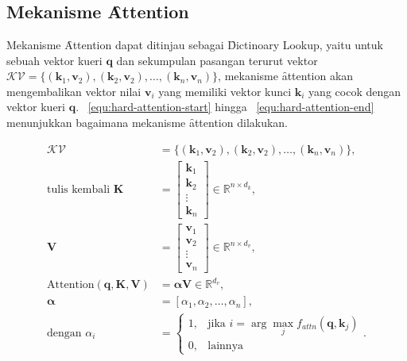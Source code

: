 \chapter{\babTiga}
\label{bab:3}


\section{Mekanisme \f{Attention}}


Mekanisme \f{Attention} dapat ditinjau sebagai \f{Dictinoary Lookup}, yaitu untuk sebuah vektor kueri $\mathbf{q}$ dan sekumpulan pasangan terurut vektor $\mathcal{KV} = \{(\mathbf{k}_1, \mathbf{v}_2), (\mathbf{k}_2, \mathbf{v}_2), \dots, (\mathbf{k}_n, \mathbf{v}_n)\}$, mekanisme \f{attention} akan mengembalikan vektor nilai $\mathbf{v}_i$ yang memiliki vektor kunci $\mathbf{k}_i$ yang cocok dengan vektor kueri $\mathbf{q}$. \equ~\ref{equ:hard-attention-start} hingga \equ~\ref{equ:hard-attention-end} menunjukkan bagaimana mekanisme \f{attention} dilakukan.

\begin{align}
	\label{equ:hard-attention-start}
	\mathcal{KV} &= \{(\mathbf{k}_1, \mathbf{v}_2), (\mathbf{k}_2, \mathbf{v}_2), \dots, (\mathbf{k}_n, \mathbf{v}_n)\}, \\
	\text{tulis kembali }\mathbf{K}&= \begin{bmatrix}
		\mathbf{k}_1 \\
		\mathbf{k}_2 \\
		\vdots \\
		\mathbf{k}_n
	\end{bmatrix} \in \mathbb{R}^{n \times d_k}, \\
	\mathbf{V} &= \begin{bmatrix}
		\mathbf{v}_1 \\
		\mathbf{v}_2 \\
		\vdots \\
		\mathbf{v}_n
	\end{bmatrix} \in \mathbb{R}^{n \times d_v}, \\
	\text{Attention}(\mathbf{q}, \mathbf{K}, \mathbf{V}) &= \bm{\alpha}\mathbf{V} \in \mathbb{R}^{d_v},\\
	\bm{\alpha} &= [\alpha_{1}, \alpha_{2}, \dots, \alpha_{n}], \\
	\label{equ:hard-attention-end}
	\text{dengan } \alpha_i &= 
	\begin{cases}
		1, & \text{jika } i = \arg\max_{j} f_{attn}(\mathbf{q}, \mathbf{k}_j) \\
	0, & \text{lainnya}
	\end{cases}.
	\end{align}


